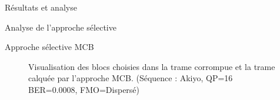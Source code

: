 \begin{chapter}{Résultats et analyse}
\begin{section}{Analyse de l'approche sélective}
\begin{subsection}{Approche sélective MCB}
\begin{figure}[htb]
{\begin{varwidth}{\textwidth}
{\label{fig-AkiyoFcChoice}
}
\end{varwidth}} 
\caption[Blocs choisis dans la trame corrompue et la trame calquée par
l'approche MCB (dispersé)]{Visualisation des blocs choisies dans la trame
corrompue et la trame calquée par l'approche MCB. (Séquence : Akiyo, QP=16 BER=0.0008,
FMO=Dispersé)}
\label{fig-AkiyoBlockSel}
\end{figure}


\end{subsection}
\end{section}
\end{chapter}
